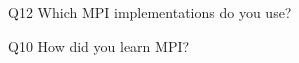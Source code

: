 \begin{description}%
\item{Q12} Which MPI implementations do you use?%
\item{Q10} How did you learn MPI?%
\end{description}%
